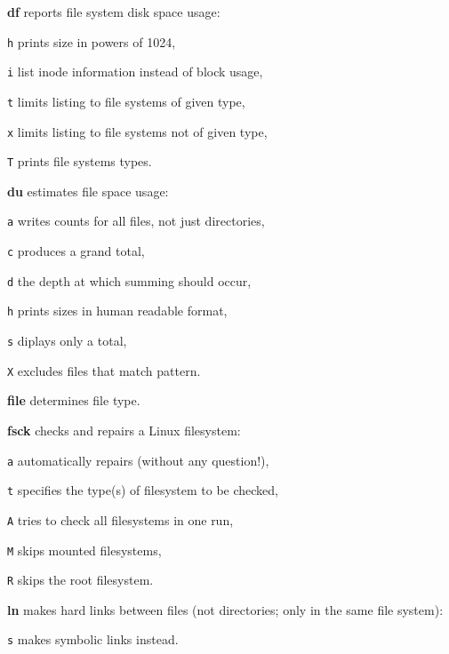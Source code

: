 \begin{enumx}
	\item [\cmdblack] \textbf{df} reports file system disk space usage:
	\item [\texttt{h}] prints size in powers of 1024,
	\item [\texttt{i}] list inode information instead of block usage,
	\item [\texttt{t}] limits listing to file systems of given type,
	\item [\texttt{x}] limits listing to file systems not of given type,
	\item [\texttt{T}] prints file systems types.
	
	\item [\cmdblack] \textbf{du} estimates file space usage:
	\item [\texttt{a}] writes counts for all files, not just directories,
	\item [\texttt{c}] produces a grand total,
	\item [\texttt{d}] the depth at which summing should occur,
	\item [\texttt{h}] prints sizes in human readable format,
	\item [\texttt{s}] diplays only a total,
	\item [\texttt{X}] excludes files that match pattern.
\end{enumx}


\begin{enumx}
	\item [\cmd] \textbf{file} determines file type.
\end{enumx}

\begin{enumx}
	\item [\cmd] \textbf{fsck} checks and repairs a Linux filesystem:
	\item [\texttt{a}] automatically repairs (without any question!),
	\item [\texttt{t}] specifies the type(s) of filesystem to be checked,
	\item [\texttt{A}] tries to check all filesystems in one run,
	\item [\texttt{M}] skips mounted filesystems,
	\item [\texttt{R}] skips the root filesystem.
\end{enumx}

\begin{enumx}
	\item [\cmdblack] \textbf{ln} makes hard links between files
	(not directories; only in the same file system):
	\item [\texttt{s}]  makes symbolic links instead.
\end{enumx}

